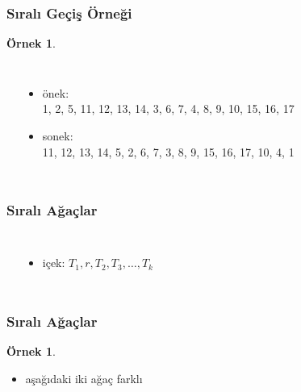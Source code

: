 \documentclass[dvipsnames]{beamer}
\theoremstyle{definition}
\theoremstyle{example}
\newtheorem{ornek}[theorem]{Örnek}
\theoremstyle{plain}
\begin{document}
\begin{frame}
  \frametitle{Sıralı Geçiş Örneği}

  \begin{ornek}
    \begin{columns}
      \begin{center}
      \end{center}

      \pause
      \begin{itemize}
        \item önek:\\
          1, 2, 5, 11, 12, 13, 14, 3, 6, 7, 4, 8, 9, 10, 15, 16, 17
        \item sonek:\\
          11, 12, 13, 14, 5, 2, 6, 7, 3, 8, 9, 15, 16, 17, 10, 4, 1
      \end{itemize}
    \end{columns}
  \end{ornek}
\end{frame}

\begin{frame}
  \frametitle{Sıralı Ağaçlar}

  \begin{columns}
    \begin{center}
    \end{center}

    \begin{itemize}
      \item içek: $T_1, r, T_2, T_3, \ldots, T_k$
    \end{itemize}
  \end{columns}
\end{frame}

\begin{frame}
  \frametitle{Sıralı Ağaçlar}

  \begin{ornek}
    \begin{itemize}
      \item aşağıdaki iki ağaç farklı
    \end{itemize}

    \begin{center}
    \end{center}
  \end{ornek}
\end{frame}
\end{document}
